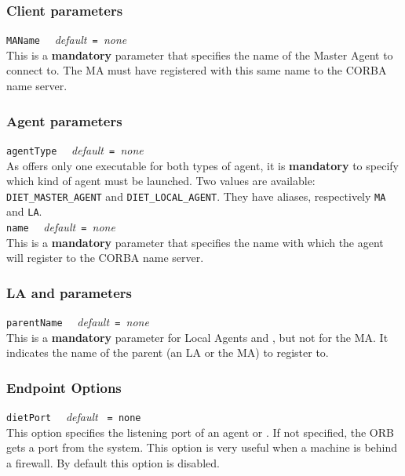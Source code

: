 \subsubsection{Client parameters}

\noindent
\texttt{MAName} \ \ \emph{default}\texttt{ = }\emph{none}\\ This is a
\textbf{mandatory} parameter that specifies the name of the Master Agent to
connect to. The MA must have registered with this same name to the CORBA name
server.


\subsubsection{Agent parameters}

\noindent
\texttt{agentType} \ \ \emph{default}\texttt{ = }\emph{none}\\ As \diet offers
only one executable for both types of agent, it is \textbf{mandatory} to
specify which kind of agent must be launched. Two values are available:
\texttt{DIET\_MASTER\_AGENT} and \texttt{DIET\_LOCAL\_AGENT}.  They have
aliases, respectively \texttt{MA} and \texttt{LA}.  \\

\noindent
\texttt{name} \ \ \emph{default}\texttt{ = }\emph{none}\\ This is a
\textbf{mandatory} parameter that specifies the name with which the agent will
register to the CORBA name server.


\subsubsection{LA and \sed parameters}

\noindent
\texttt{parentName} \ \ \emph{default}\texttt{ = }\emph{none}\\ This is a
\textbf{mandatory} parameter for Local Agents and \seds, but not for the MA.
It indicates the name of the parent (an LA or the MA) to register to.

\subsubsection{Endpoint Options}

\noindent
\texttt{dietPort} \ \ \emph{default} \texttt{ = none }\\ This option specifies
the listening port of an agent or \sed. If not specified, the ORB gets a port
from the system. This option is very useful when a machine is behind a
firewall. By default this option is disabled.\\


